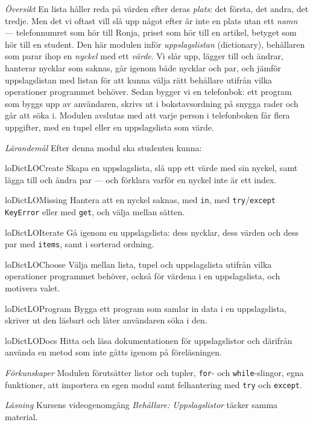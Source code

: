 \emph{Översikt}
En lista håller reda på värden efter deras \emph{plats}: det första, det
andra, det tredje.  Men det vi oftast vill slå upp något efter är inte en
plats utan ett \emph{namn} --- telefonnumret som hör till Ronja, priset
som hör till en artikel, betyget som hör till en student.  Den här
modulen inför \emph{uppslagslistan}
(\foreignlanguage{english}{dictionary}), behållaren som parar ihop en
\emph{nyckel} med ett \emph{värde}.  Vi slår upp, lägger till och ändrar,
hanterar nycklar som saknas, går igenom både nycklar och par, och
jämför uppslagslistan med listan för att kunna välja rätt behållare
utifrån vilka operationer programmet behöver.  Sedan bygger vi en
telefonbok: ett program som byggs upp av användaren, skrivs ut i
bokstavsordning på snygga rader och går att söka i.  Modulen avslutas
med att varje person i telefonboken får flera uppgifter, med en tupel
eller en uppslagslista som värde.

\emph{Lärandemål}
Efter denna modul ska studenten kunna:
\begin{restatable}{lo}{DictLOCreate}\label{DictLOCreate}%
  Skapa en uppslagslista, slå upp ett värde med sin nyckel, samt lägga
  till och ändra par --- och förklara varför en nyckel inte är ett
  index.
\end{restatable}%
\begin{restatable}{lo}{DictLOMissing}\label{DictLOMissing}%
  Hantera att en nyckel saknas, med \texttt{in},
  med \texttt{try}/\texttt{except KeyError}
  eller med \texttt{get}, och välja mellan sätten.
\end{restatable}%
\begin{restatable}{lo}{DictLOIterate}\label{DictLOIterate}%
  Gå igenom en uppslagslista: dess nycklar, dess värden och dess par
  med \texttt{items}, samt i sorterad ordning.
\end{restatable}%
\begin{restatable}{lo}{DictLOChoose}\label{DictLOChoose}%
  Välja mellan lista, tupel och uppslagslista utifrån vilka operationer
  programmet behöver, också för värdena i en uppslagslista, och motivera
  valet.
\end{restatable}%
\begin{restatable}{lo}{DictLOProgram}\label{DictLOProgram}%
  Bygga ett program som samlar in data i en uppslagslista, skriver ut
  den läsbart och låter användaren söka i den.
\end{restatable}%
\begin{restatable}{lo}{DictLODocs}\label{DictLODocs}%
  Hitta och läsa dokumentationen för uppslagslistor och därifrån
  använda en metod som inte gåtts igenom på föreläsningen.
\end{restatable}%

\emph{Förkunskaper}
Modulen förutsätter listor och tupler, \texttt{for}- och
\texttt{while}-slingor, egna funktioner, att importera en
egen modul samt felhantering med
\texttt{try} och \texttt{except}.

\emph{Läsning}
Kursens videogenomgång \emph{Behållare: Uppslagslistor} täcker samma
material.
